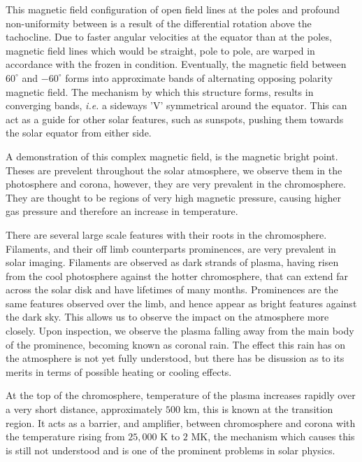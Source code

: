 This magnetic field configuration of open field lines at the poles and profound non-uniformity between is a result of the differential rotation above the tachocline.
Due to faster angular velocities at the equator than at the poles, magnetic field lines which would be straight, pole to pole, are warped in accordance with the frozen in condition.
Eventually, the magnetic field between $60^\circ$ and $-60^\circ$ forms into approximate bands of alternating opposing polarity magnetic field.
The mechanism by which this structure forms, results in converging bands, \emph{i.e.} a sideways 'V' symmetrical around the equator.
This can act as a guide for other solar features, such as sunspots, pushing them towards the solar equator from either side.

A demonstration of this complex magnetic field, is the magnetic bright point.
Theses are prevelent throughout the solar atmosphere, we observe them in the photosphere and corona, however, they are very prevalent in the chromosphere.
They are thought to be regions of very high magnetic pressure, causing higher gas pressure and therefore an increase in temperature.


There are several large scale features with their roots in the chromosphere.
Filaments, and their off limb counterparts prominences, are very prevalent in solar imaging.
Filaments are observed as dark strands of plasma, having risen from the cool photosphere against the hotter chromosphere, that can extend far across the solar disk and have lifetimes of many months.
Prominences are the same features observed over the limb, and hence appear as bright features against the dark sky.
This allows us to observe the impact on the atmosphere more closely. 
Upon inspection, we observe the plasma falling away from the main body of the prominence, becoming known as coronal rain.
The effect this rain has on the atmosphere is not yet fully understood, but there has be disussion as to its merits in terms of possible heating or cooling effects.

At the top of the chromosphere, temperature of the plasma increases rapidly over a very short distance, approximately $500$ km, this is known at the transition region.
It acts as a barrier, and amplifier, between chromosphere and corona with the temperature rising from $25,000$ K to $2$ MK, the mechanism which causes this is still not understood and is one of the prominent problems in solar physics.

